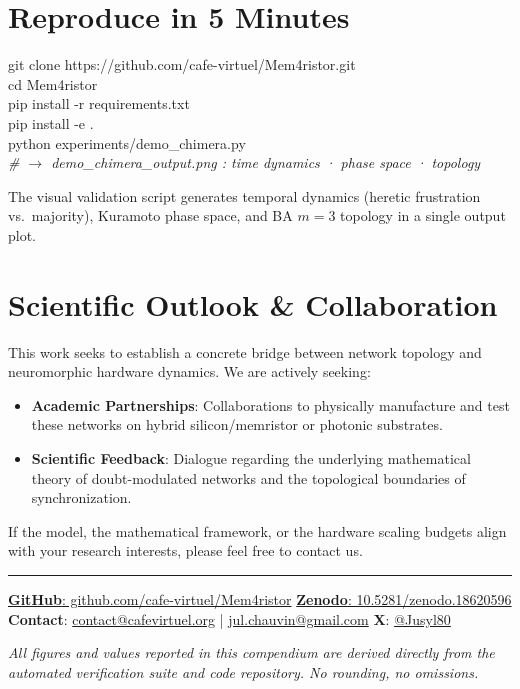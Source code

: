 \documentclass[11pt, a4paper]{article}
\begin{document}
\section{Reproduce in 5 Minutes}

\begin{codebox}
\ttfamily\small
git clone https://github.com/cafe-virtuel/Mem4ristor.git\\
cd Mem4ristor\\
pip install -r requirements.txt\\
pip install -e .\\
python experiments/demo\_chimera.py\\
\textit{\# $\to$ demo\_chimera\_output.png : time dynamics · phase space · topology}
\end{codebox}

The visual validation script generates temporal dynamics (heretic frustration vs.\ majority), Kuramoto phase space, and BA $m=3$ topology in a single output plot.

\section{Scientific Outlook \& Collaboration}

This work seeks to establish a concrete bridge between network topology and neuromorphic hardware dynamics. We are actively seeking:
\begin{itemize}
    \item \textbf{Academic Partnerships}: Collaborations to physically manufacture and test these networks on hybrid silicon/memristor or photonic substrates.
    \item \textbf{Scientific Feedback}: Dialogue regarding the underlying mathematical theory of doubt-modulated networks and the topological boundaries of synchronization.
\end{itemize}
If the model, the mathematical framework, or the hardware scaling budgets align with your research interests, please feel free to contact us.

\vspace{0.5em}
\color{rulecol}\rule{\linewidth}{0.5pt}\color{black}
\vspace{0.3em}

\begin{center}
\small
\href{https://github.com/cafe-virtuel/Mem4ristor}{\textbf{GitHub}: github.com/cafe-virtuel/Mem4ristor}
\quad\textbar\quad
\href{https://doi.org/10.5281/zenodo.18620596}{\textbf{Zenodo}: 10.5281/zenodo.18620596}
\quad\textbar\quad
\textbf{Contact}: \href{mailto:contact@cafevirtuel.org}{contact@cafevirtuel.org} | \href{mailto:jul.chauvin@gmail.com}{jul.chauvin@gmail.com}
\quad\textbar\quad
\textbf{X}: \href{https://x.com/Jusyl80}{@Jusyl80}
\end{center}

\vspace{0.3em}
{\small\color{muted}\textit{All figures and values reported in this compendium are derived directly from the automated verification suite and code repository. No rounding, no omissions.}}
\end{document}
